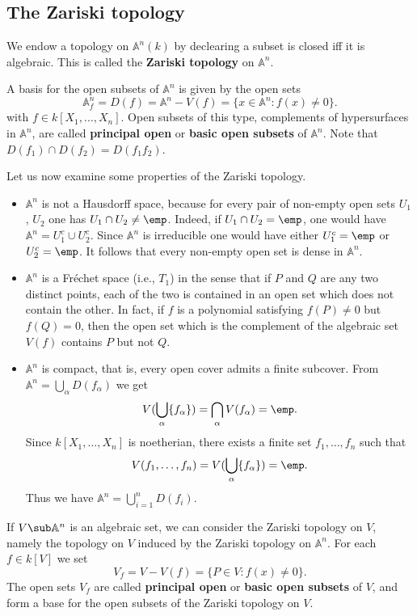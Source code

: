 \subsection{The Zariski topology}
\begin{definition}
We endow a topology on $\mathbb{A}^n(k)$ by declearing a subset is closed iff it is algebraic. This is called the \textbf{Zariski topology} on $\mathbb{A}^n$.
\end{definition}
A basis for the open subsets of $\mathbb{A}^n$ is given by the open sets
\[\mathbb{A}^n_f=D(f)=\mathbb{A}^n-V(f)=\{x\in\mathbb{A}^n:f(x)\neq 0\}.\]
with $f\in k[X_1,\dots,X_n]$. Open subsets of this type, complements of hypersurfaces in $\mathbb{A}^n$, are called \textbf{principal open} or \textbf{basic open subsets} of $\mathbb{A}^n$. Note that $D(f_1)\cap D(f_2)=D(f_1f_2)$.\par
Let us now examine some properties of the Zariski topology.
\begin{itemize}
\item $\mathbb{A}^n$ is not a Hausdorff space, because for every pair of non-empty open sets $U_1$, $U_2$ one has $U_1\cap U_2\neq\emp$. Indeed, if $U_1\cap U_2=\emp$, one would have $\mathbb{A}^n=U_1^c\cup U_2^c$. Since $\mathbb{A}^n$ is irreducible one would have either $U_1^c=\emp$ or $U_2^c=\emp$. It follows that every non-empty open set is dense in $\mathbb{A}^n$.
\item $\mathbb{A}^n$ is a Fr\'echet space (i.e., $T_1$) in the sense that if $P$ and $Q$ are any two distinct points, each of the two is contained in an open set which does not contain the other. In fact, if $f$ is a polynomial satisfying $f(P)\neq 0$ but $f(Q)=0$, then the open set which is the complement of the algebraic set $V(f)$ contains $P$ but not $Q$.
\item $\mathbb{A}^n$ is compact, that is, every open cover admits a finite subcover. From $\mathbb{A}^n=\bigcup_\alpha D(f_\alpha)$ we get
\[V(\bigcup_\alpha\{f_\alpha\})=\bigcap_\alpha V(f_\alpha)=\emp.\]
Since $k[X_1,\dots,X_n]$ is noetherian, there exists a finite set $f_1,\dots,f_n$ such that \[V(f_1,\dots,f_n)=V(\bigcup_\alpha\{f_\alpha\})=\emp.\] 
Thus we have $\mathbb{A}^n=\bigcup_{i=1}^{n}D(f_i)$.
\end{itemize}
If $V\sub\mathbb{A}^n$ is an algebraic set, we can consider the Zariski topology on $V$, namely the topology on $V$ induced by the Zariski topology on $\mathbb{A}^n$. For each $f\in k[V]$ we set
\[V_f=V-V(f)=\{P\in V:f(x)\neq 0\}.\]
The open sets $V_f$ are called \textbf{principal open} or \textbf{basic open subsets} of $V$, and form a base for the open subsets of the Zariski topology on $V$.
